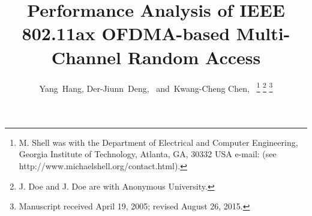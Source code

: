 \documentclass[journal]{IEEEtran}
\begin{document}
%
\title{Performance Analysis of IEEE 802.11ax OFDMA-based Multi-Channel Random Access}
%
%
%

\author{Yang~Hang,
        Der-Jiunn~Deng,~ 
        and~Kwang-Cheng Chen,~%
\thanks{M. Shell was with the Department
of Electrical and Computer Engineering, Georgia Institute of Technology, Atlanta,
GA, 30332 USA e-mail: (see http://www.michaelshell.org/contact.html).}%
\thanks{J. Doe and J. Doe are with Anonymous University.}%
\thanks{Manuscript received April 19, 2005; revised August 26, 2015.}}

% 
%
\end{document}
